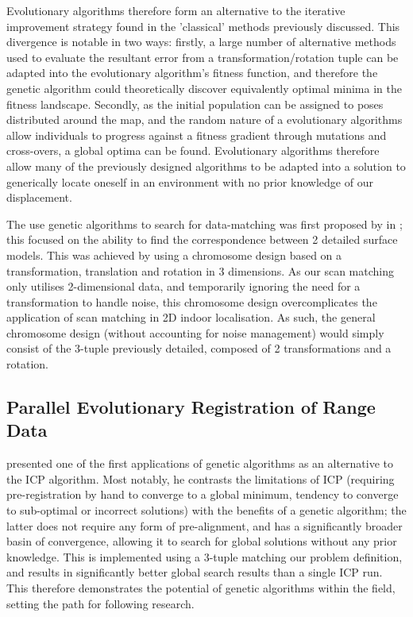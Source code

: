 \documentclass[authoryearcitations]{UoYCSproject}
\begin{document}
Evolutionary algorithms therefore form an alternative to the iterative improvement strategy found in the 'classical' methods previously discussed. This divergence is notable in two ways: firstly, a large number of alternative methods used to evaluate the resultant error from a transformation/rotation tuple can be adapted into the evolutionary algorithm's fitness function, and therefore the genetic algorithm could theoretically discover equivalently optimal minima in the fitness landscape. Secondly, as the initial population can be assigned to poses distributed around the map, and the random nature of a evolutionary algorithms allow individuals to progress against a fitness gradient through mutations and cross-overs, a global optima can be found. Evolutionary algorithms therefore allow many of the previously designed algorithms to be adapted into a solution to generically locate oneself in an environment with no prior knowledge of our displacement.

The use genetic algorithms to search for data-matching was first proposed by \citet{Brunnstrom1996-vo} in \citeyear{Brunnstrom1996-vo}; this focused on the ability to find the correspondence between 2 detailed surface models. This was achieved by using a chromosome design based on a transformation, translation and rotation in 3 dimensions. As our scan matching only utilises 2-dimensional data, and temporarily ignoring the need for a transformation to handle noise, this chromosome design overcomplicates the application of scan matching in 2D indoor localisation. As such, the general chromosome design (without accounting for noise management) would simply consist of the 3-tuple previously detailed, composed of 2 transformations and a rotation.

\subsection{Parallel Evolutionary Registration of Range Data}
\citet{Robertson2002-ou} presented one of the first applications of genetic algorithms as an alternative to the ICP algorithm. Most notably, he contrasts the limitations of ICP (requiring pre-registration by hand to converge to a global minimum, tendency to converge to sub-optimal or incorrect solutions) with the benefits of a genetic algorithm; the latter does not require any form of pre-alignment, and has a significantly broader basin of convergence, allowing it to search for global solutions without any prior knowledge. This is implemented using a 3-tuple matching our problem definition, and results in significantly better global search results than a single ICP run. This therefore demonstrates the potential of genetic algorithms within the field, setting the path for following research.
\end{document}
